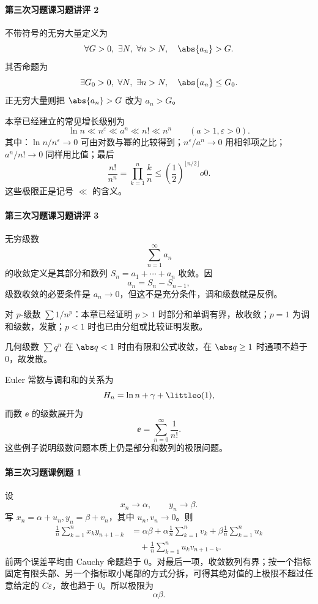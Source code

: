 \paragraph{第三次习题课习题讲评 2}
\begin{xsolution}
不带符号的无穷大量定义为
\[
  \forall G>0,\ \exists N,\ \forall n>N,
  \quad\abs{a_n}>G.
\]
其否命题为
\[
  \exists G_0>0,\ \forall N,\ \exists n>N,
  \quad\abs{a_n}\le G_0.
\]
正无穷大量则把 $\abs{a_n}>G$ 改为 $a_n>G$。

本章已经建立的常见增长级别为
\[
  \ln n\ll n^\varepsilon\ll a^n\ll n!\ll n^n
  \qquad(a>1,\varepsilon>0).
\]
其中：$\ln n/n^\varepsilon\to0$ 可由对数与幂的比较得到；$n^\varepsilon/a^n\to0$ 用相邻项之比；$a^n/n!\to0$ 同样用比值；最后
\[
  \frac{n!}{n^n}
  =\prod_{k=1}^n\frac kn
  \le\left(\frac12\right)^{\lfloor n/2\rfloor}	o0.
\]
这些极限正是记号 $\ll$ 的含义。
\end{xsolution}

\paragraph{第三次习题课习题讲评 3}
\begin{xsolution}
无穷级数
\[
  \sum_{n=1}^{\infty}a_n
\]
的收敛定义是其部分和数列 $S_n=a_1+\cdots+a_n$ 收敛。因
\[
  a_n=S_n-S_{n-1},
\]
级数收敛的必要条件是 $a_n\to0$，但这不是充分条件，调和级数就是反例。

对 $p$-级数 $\sum1/n^p$：本章已经证明 $p>1$ 时部分和单调有界，故收敛；$p=1$ 为调和级数，发散；$p<1$ 时也已由分组或比较证明发散。

几何级数 $\sum q^n$ 在 $\abs q<1$ 时由有限和公式收敛，在 $\abs q\ge1$ 时通项不趋于 $0$，故发散。

Euler 常数与调和和的关系为
\[
  H_n=\ln n+\gamma+\littleo(1),
\]
而数 $\ee$ 的级数展开为
\[
  \ee=\sum_{n=0}^{\infty}\frac1{n!}.
\]
这些例子说明级数问题本质上仍是部分和数列的极限问题。
\end{xsolution}

\paragraph{第三次习题课例题 1}
\begin{xsolution}
设
\[
  x_n\to\alpha,\qquad y_n\to\beta.
\]
写 $x_n=\alpha+u_n,y_n=\beta+v_n$，其中 $u_n,v_n\to0$。则
\begin{align*}
  \frac1n\sum_{k=1}^n x_ky_{n+1-k}
  &=\alpha\beta
   +\alpha\frac1n\sum_{k=1}^n v_k
   +\beta\frac1n\sum_{k=1}^n u_k\\
  &\quad+\frac1n\sum_{k=1}^n u_kv_{n+1-k}.
\end{align*}
前两个误差平均由 Cauchy 命题趋于 $0$。对最后一项，收敛数列有界；按一个指标固定有限头部、另一个指标取小尾部的方式分拆，可得其绝对值的上极限不超过任意给定的 $C\varepsilon$，故也趋于 $0$。所以极限为
\[
  \boxed{\alpha\beta}.
\]
\end{xsolution}

